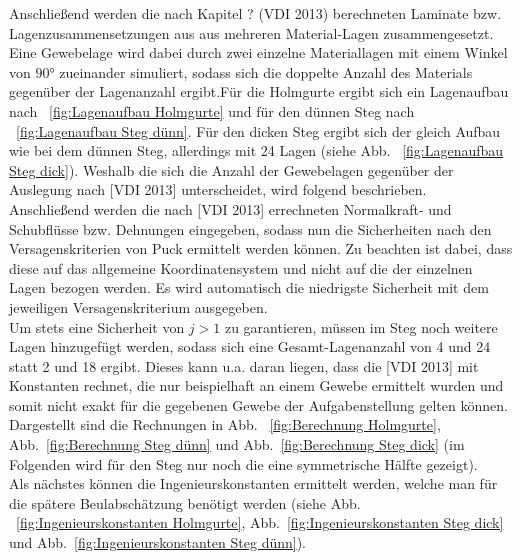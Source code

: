 \noindent Anschließend werden die nach Kapitel ? (VDI 2013) berechneten Laminate bzw. Lagenzusammensetzungen aus aus mehreren Material-Lagen zusammengesetzt. Eine Gewebelage wird dabei durch zwei einzelne Materiallagen mit einem Winkel von $90°$ zueinander simuliert, sodass sich die doppelte Anzahl des Materials gegenüber der Lagenanzahl ergibt.Für die Holmgurte ergibt sich ein Lagenaufbau nach ~\ref{fig:Lagenaufbau Holmgurte} und für den dünnen Steg nach ~\ref{fig:Lagenaufbau Steg dünn}. Für den dicken Steg ergibt sich der gleich Aufbau wie bei dem dünnen Steg, allerdings mit 24 Lagen (siehe Abb. ~\ref{fig:Lagenaufbau Steg dick}). Weshalb die sich die Anzahl der Gewebelagen gegenüber der Auslegung nach [VDI 2013] unterscheidet, wird folgend beschrieben.\\ 

\noindent Anschließend werden die nach [VDI 2013] errechneten Normalkraft- und Schubflüsse bzw. Dehnungen eingegeben, sodass nun die Sicherheiten nach den Versagenskriterien von Puck ermittelt werden können. Zu beachten ist dabei, dass diese auf das allgemeine Koordinatensystem und nicht auf die der einzelnen Lagen bezogen werden. Es wird automatisch die niedrigste Sicherheit mit dem jeweiligen Versagenskriterium ausgegeben.\\

\noindent Um stets eine Sicherheit von $j>1$ zu garantieren, müssen im Steg noch weitere Lagen hinzugefügt werden, sodass sich eine Gesamt-Lagenanzahl von 4 und 24 statt 2 und 18 ergibt. Dieses kann u.a. daran liegen, dass die [VDI 2013] mit Konstanten rechnet, die nur beispielhaft an einem Gewebe ermittelt wurden und somit nicht exakt für die gegebenen Gewebe der Aufgabenstellung gelten können.
Dargestellt sind die Rechnungen in Abb. ~\ref{fig:Berechnung Holmgurte}, Abb.~\ref{fig:Berechnung Steg dünn} und Abb.~\ref{fig:Berechnung Steg dick} (im Folgenden wird für den Steg nur noch die eine symmetrische Hälfte gezeigt).\\

\noindent Als nächstes können die Ingenieurskonstanten ermittelt werden, welche man für die spätere Beulabschätzung benötigt werden (siehe Abb. ~\ref{fig:Ingenieurskonstanten Holmgurte}, Abb.~\ref{fig:Ingenieurskonstanten Steg dick} und Abb.~\ref{fig:Ingenieurskonstanten Steg dünn}).